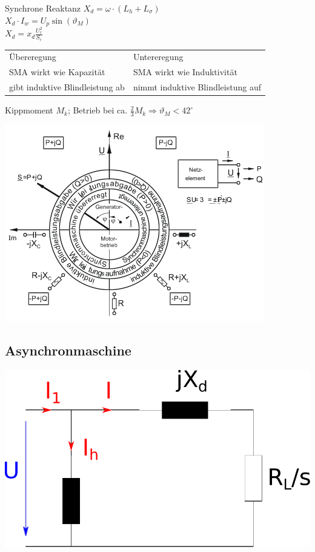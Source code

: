 \documentclass[european]{latex4ei_sheet}
\begin{document}
		Synchrone Reaktanz $X_d = \omega \cdot (L_h + L_\sigma)$\\
		$X_d \cdot I_w = U_p \sin(\vartheta_M)$\\
		$X_d = x_d \frac{U_r^2}{S_r}$ \\
		\begin{tabular}{ll}
			Übereregung & Untereregung\\ \mrule
			SMA wirkt wie Kapazität & SMA wirkt wie Induktivität\\
			gibt induktive Blindleistung ab & nimmt induktive Blindleistung auf\\
		\end{tabular}
		
		Kippmoment $M_k$; Betrieb bei ca. $\frac{2}{3} M_k \Rightarrow \vartheta_M < 42^\circ$\\
		
		\begin{center}
		\includegraphics[scale=.6]{./img/synchronmaschine_betriebsbereiche.jpg}
		\end{center}
		
		\subsection{Asynchronmaschine}
		
		\begin{center}
		\includegraphics[scale=.2]{./img/ersatzschaltbild_asynchronmaschine.pdf}
		\end{center}
		 
\end{document}
